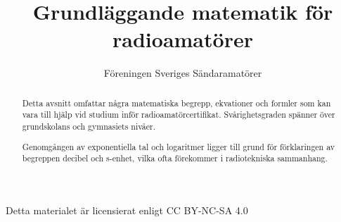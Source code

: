 \documentclass[a4paper]{article}
\begin{document}
\title{Grundläggande matematik för radioamatörer}
\author{Föreningen Sveriges Sändaramatörer}

\maketitle

Detta materialet är licensierat enligt CC BY-NC-SA 4.0

\begin{abstract}
Detta avsnitt omfattar några matematiska begrepp, ekvationer och formler som kan
vara till hjälp vid studium inför radioamatörcertifikat. Svårighetsgraden
spänner över grundskolans och gymnasiets nivåer.

Genomgången av exponentiella tal och logaritmer ligger till grund för
förklaringen av begreppen decibel och s-enhet, vilka ofta förekommer i
radiotekniska sammanhang.
\end{abstract}


\end{document}
